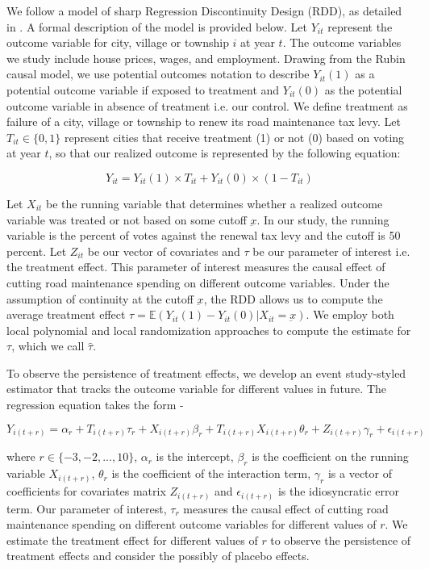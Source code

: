 We follow a model of sharp Regression Discontinuity Design (RDD), as detailed in \cite{calonico2019regression}. A formal description of the model is provided below. Let $Y_{it}$ represent the outcome variable for city, village or township $i$ at year $t$. The outcome variables we study include house prices, wages, and employment. Drawing from the Rubin causal model, we use potential outcomes notation to describe $Y_{it}(1)$ as a potential outcome variable if exposed to treatment and $Y_{it}(0)$ as the potential outcome variable in absence of treatment i.e. our control. We define treatment as failure of a city, village or township to renew its road maintenance tax levy. Let $T_{it} \in \{0,1\}$ represent cities that receive treatment (1) or not (0) based on voting at year $t$, so that our realized outcome is represented by the following equation:

$$
Y_{it} = Y_{it}(1) \times T_{it} + Y_{it}(0) \times (1-T_{it})
$$

Let $X_{it}$ be the running variable that determines whether a realized outcome variable was treated or not based on some cutoff $\underbar{x}$. In our study, the running variable is the percent of votes against the renewal tax levy and the cutoff is 50 percent. Let $Z_{it}$ be our vector of covariates and $\tau$ be our parameter of interest i.e. the treatment effect. This parameter of interest measures the causal effect of cutting road maintenance spending on different outcome variables. Under the assumption of continuity at the cutoff $\underbar{x}$, the RDD allows us to compute the average treatment effect $\tau = \mathbb{E}(Y_{it}(1) - Y_{it}(0) | X_{it} = \underbar{x})$. We employ both local polynomial and local randomization approaches to compute the estimate for $\tau$, which we call $\hat{\tau}$.

To observe the persistence of treatment effects, we develop an event study-styled estimator that tracks the outcome variable for different values in future. The regression equation takes the form -

$$
Y_{i(t+r)} = \alpha_r + T_{i(t+r)} \tau_r + X_{i(t+r)} \beta_r + T_{i(t+r)} X_{i(t+r)} \theta_r + Z_{i(t+r)} \gamma_r + \epsilon_{i(t+r)}
$$

\noindent where $r \in \{-3,-2, ..., 10 \}$, $\alpha_r$ is the intercept, $\beta_r$ is the coefficient on the running variable $X_{i(t+r)}$, $\theta_r$ is the coefficient of the interaction term, $\gamma_r$ is a vector of coefficients for covariates matrix $Z_{i(t+r)}$ and $\epsilon_{i(t+r)}$ is the idiosyncratic error term. Our parameter of interest, $\tau_r$ measures the causal effect of cutting road maintenance spending on different outcome variables for different values of $r$. We estimate the treatment effect for different values of $r$ to observe the persistence of treatment effects and consider the possibly of placebo effects. 

